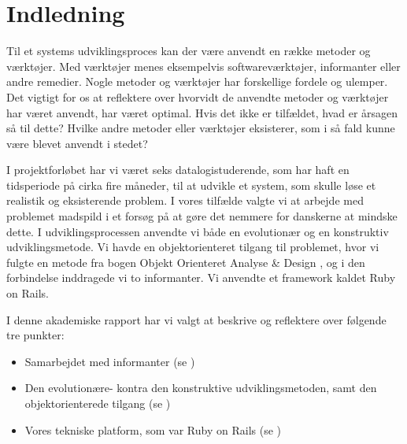 \chapter{Indledning}

Til et systems udviklingsproces kan der være anvendt en række metoder og værktøjer. Med værktøjer menes eksempelvis softwareværktøjer, informanter eller andre remedier. Nogle metoder og værktøjer har forskellige fordele og ulemper. Det vigtigt for os at reflektere over hvorvidt de anvendte metoder og værktøjer har været anvendt, har været optimal. Hvis det ikke er tilfældet, hvad er årsagen så til dette? Hvilke andre metoder eller værktøjer eksisterer, som i så fald kunne være blevet anvendt i stedet?

I projektforløbet har vi været seks datalogistuderende, som har haft en tidsperiode på cirka fire måneder, til at udvikle et system, som skulle løse et realistik og eksisterende problem. I vores tilfælde valgte vi at arbejde med problemet madspild i et forsøg på at gøre det nemmere for danskerne at mindske dette. I udviklingsprocessen anvendte vi både en evolutionær og en konstruktiv udviklingsmetode. Vi havde en objektorienteret tilgang til problemet, hvor vi fulgte en metode fra bogen Objekt Orienteret Analyse \& Design \cite{ooad}, og i den forbindelse inddragede vi to informanter. Vi anvendte et framework kaldet Ruby on Rails. 

I denne akademiske rapport har vi valgt at beskrive og reflektere over følgende tre punkter:

\begin{itemize}[noitemsep]
  \item Samarbejdet med informanter (se )
  \item Den evolutionære- kontra den konstruktive udviklingsmetoden, samt den objektorienterede tilgang (se )
  \item Vores tekniske platform, som var Ruby on Rails (se )
\end{itemize}


